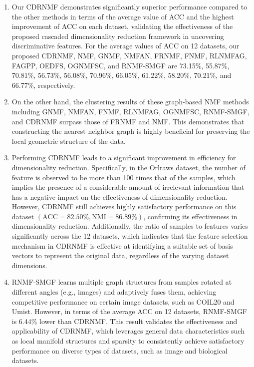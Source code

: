\documentclass[a4paper,fleqn]{cas-sc}
\begin{document}
\begin{enumerate}[(1)]
	\item Our CDRNMF demonstrates significantly superior performance compared to the other methods in terms of the average value of ACC and the highest improvement of ACC on each dataset, validating the effectiveness of the proposed cascaded dimensionality reduction framework in uncovering discriminative features. For the average values of ACC on 12 datasets, our proposed CDRNMF, NMF, GNMF, NMFAN, FRNMF, FNMF, RLNMFAG, FAGPP, OEDFS, OGNMFSC, and  RNMF-SMGF are 73.15\%, 55.87\%, 70.81\%, 56.73\%, 56.08\%, 70.96\%, 66.05\%, 61.22\%, 58.20\%, 70.21\%, and 66.77\%, respectively.
	
	\item On the other hand, the clustering results of these graph-based NMF methods including GNMF, NMFAN, FNMF, RLNMFAG, OGNMFSC, RNMF-SMGF, and CDRNMF surpass those of FRNMF and NMF. This demonstrates that constructing the nearest neighbor graph is highly beneficial for preserving the local geometric structure of the data.
	
	\item Performing CDRNMF leads to a significant improvement in efficiency for dimensionality reduction. Specifically, in the Orlraws dataset, the number of feature is observed to be more than 100 times that of the samples, which implies the presence of a considerable amount of irrelevant information that has a negative impact on the effectiveness of dimensionality reduction. However, CDRNMF still achieves highly satisfactory performance on this dataset $(\mathrm{ACC}=82.50 \%, \mathrm{NMI}=86.89 \%)$, confirming its effectiveness in dimensionality reduction. Additionally, the ratio of samples to features varies significantly across the 12 datasets, which indicates that the feature selection mechanism in CDRNMF is effective at identifying a suitable set of basis vectors to represent the original data, regardless of the varying dataset dimensions.
	
	\item RNMF-SMGF learns multiple graph structures from samples rotated at different angles (e.g., images) and adaptively fuses them, achieving competitive performance on certain image datasets, such as COIL20 and Umist. However, in terms of the average ACC on 12 datasets, RNMF-SMGF is 6.44\% lower than CDRNMF. This result validates the effectiveness and applicability of CDRNMF, which leverages general data characteristics such as local manifold structures and sparsity to consistently achieve satisfactory performance on diverse types of datasets, such as image and biological datasets.
	

\end{enumerate}
\end{document}
